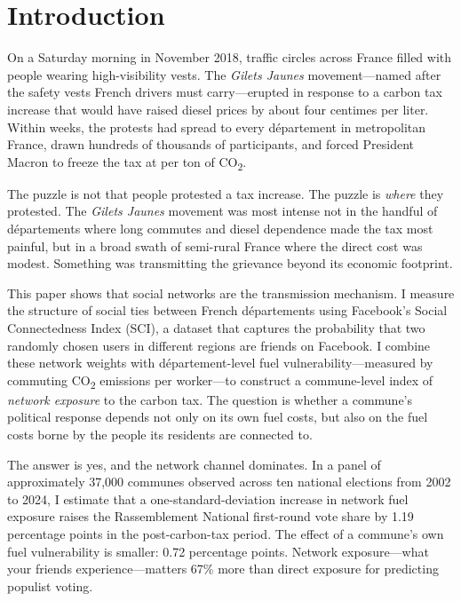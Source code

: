 \documentclass[12pt]{article}
\providecommand{\euro}{\texteuro}
\newcommand{\rn}{Rassemblement National}
\newcommand{\gj}{\textit{Gilets Jaunes}}
\newcommand{\dept}{d\'{e}partement}
\newcommand{\depts}{d\'{e}partements}
\begin{document}

\section{Introduction}
\label{sec:intro}

On a Saturday morning in November 2018, traffic circles across France filled with people wearing high-visibility vests. The \gj{} movement---named after the safety vests French drivers must carry---erupted in response to a carbon tax increase that would have raised diesel prices by about four centimes per liter. Within weeks, the protests had spread to every \dept{} in metropolitan France, drawn hundreds of thousands of participants, and forced President Macron to freeze the tax at \euro 44.60 per ton of CO\textsubscript{2}.

The puzzle is not that people protested a tax increase. The puzzle is \emph{where} they protested. The \gj{} movement was most intense not in the handful of \depts{} where long commutes and diesel dependence made the tax most painful, but in a broad swath of semi-rural France where the direct cost was modest. Something was transmitting the grievance beyond its economic footprint.

This paper shows that social networks are the transmission mechanism. I measure the structure of social ties between French \depts{} using Facebook's Social Connectedness Index (SCI), a dataset that captures the probability that two randomly chosen users in different regions are friends on Facebook. I combine these network weights with \dept{}-level fuel vulnerability---measured by commuting CO\textsubscript{2} emissions per worker---to construct a commune-level index of \emph{network exposure} to the carbon tax. The question is whether a commune's political response depends not only on its own fuel costs, but also on the fuel costs borne by the people its residents are connected to.

The answer is yes, and the network channel dominates. In a panel of approximately 37,000 communes observed across ten national elections from 2002 to 2024, I estimate that a one-standard-deviation increase in network fuel exposure raises the \rn{} first-round vote share by 1.19 percentage points in the post-carbon-tax period. The effect of a commune's own fuel vulnerability is smaller: 0.72 percentage points. Network exposure---what your friends experience---matters 67\% more than direct exposure for predicting populist voting.
\end{document}
